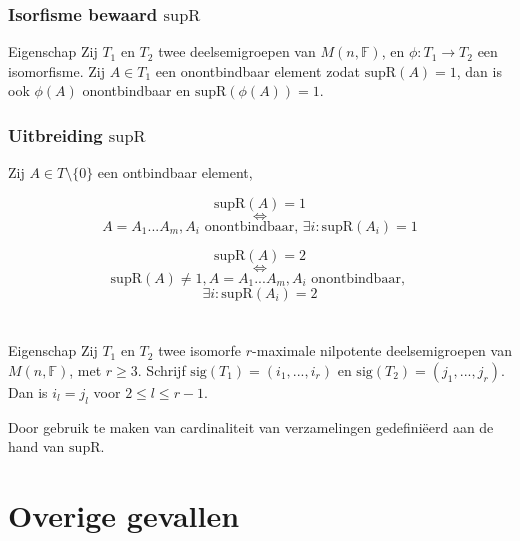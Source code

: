 \documentclass[12pt]{beamer}
\newcommand{\F}{\mathbb{F}}
\newcommand{\sig}{\mathrm{sig}}
\newcommand{\supR}{\mathrm{supR}}
\begin{document}
\begin{frame}
\frametitle{Isorfisme bewaard $\supR$}

\begin{block}{Eigenschap}
Zij $T_1$ en $T_2$ twee deelsemigroepen van $M(n,\F)$, en $\phi :T_1 \to T_2$ een isomorfisme. Zij $A \in T_1$ een onontbindbaar element zodat $\supR(A) = 1$, dan is ook $\phi(A)$ onontbindbaar en $\supR(\phi(A)) = 1$.
\end{block}

\end{frame}


\begin{frame}
\frametitle{Uitbreiding $\supR$}

\begin{block}{}
Zij $A \in T\setminus \{0 \}$ een ontbindbaar element,
\end{block}


\begin{block}{}
$$\supR(A) = 1$$
$$\Leftrightarrow$$
$$A = A_1...A_m, A_i \text{ onontbindbaar, } \exists i : \supR(A_i) = 1$$
\end{block}

\begin{block}{}
$$\supR(A) = 2$$
$$\Leftrightarrow$$
$$\supR(A) \neq 1, A = A_1...A_m, A_i \text{ onontbindbaar, } $$
$$\exists i : \supR(A_i) = 2$$
\end{block}

\end{frame}


\begin{frame}
\frametitle{ $ $ }

\begin{block}{Eigenschap}
Zij $T_1$ en $T_2$ twee isomorfe $r$-maximale nilpotente deelsemigroepen van $M(n,\F)$, met $r \geq 3$. Schrijf $\sig(T_1) = (i_1, ..., i_r)$ en $\sig(T_2) = (j_1, ..., j_r)$. Dan is $i_l = j_l$ voor $2 \leq l \leq r-1$.
\end{block}

\begin{block}{}
Door gebruik te maken van cardinaliteit van verzamelingen gedefini\"eerd aan de hand van $\supR$.
\end{block}

\end{frame}


\section{Overige gevallen}
\end{document}
